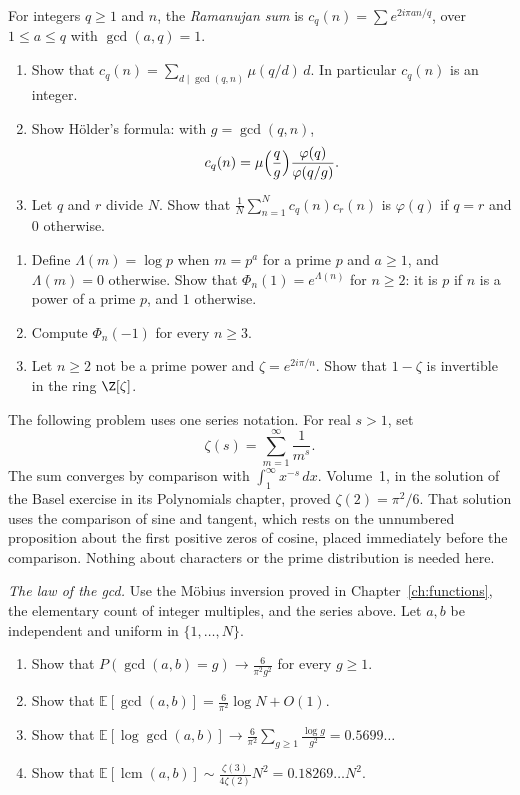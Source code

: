 \begin{exercise}[$\star\star$]\label{pb:ramsum}
For integers $q\ge1$ and $n$, the \emph{Ramanujan sum} is $c_q(n)=\sum e^{2i\pi an/q}$, over $1\le a\le q$ with
$\gcd(a,q)=1$.
\begin{enumerate}[label=(\alph*)]
\item Show that $c_q(n)=\sum_{d\mid\gcd(q,n)}\mu(q/d)\,d$. In particular $c_q(n)$ is an integer.
\item Show Hölder's formula: with $g=\gcd(q,n)$,
\[
c_q(n)=\mu\Bigl(\frac qg\Bigr)\frac{\varphi(q)}{\varphi(q/g)}.
\]
\item Let $q$ and $r$ divide $N$. Show that $\frac1N\sum_{n=1}^Nc_q(n)c_r(n)$ is $\varphi(q)$ if $q=r$ and $0$ otherwise.
\end{enumerate}
\end{exercise}

\begin{exercise}[$\star\star$]\label{pb:phipm1}
\begin{enumerate}[label=(\alph*)]
\item Define $\Lambda(m)=\log p$ when $m=p^a$ for a prime $p$ and $a\ge1$, and $\Lambda(m)=0$ otherwise. Show that $\Phi_n(1)=e^{\Lambda(n)}$ for $n\ge2$: it is $p$ if $n$ is a power of a prime $p$, and $1$ otherwise.
\item Compute $\Phi_n(-1)$ for every $n\ge3$.
\item Let $n\ge2$ not be a prime power and $\zeta=e^{2i\pi/n}$. Show that $1-\zeta$ is invertible in the ring $\Z[\zeta]$.
\end{enumerate}
\end{exercise}

The following problem uses one series notation. For real $s>1$, set
\[
\zeta(s)=\sum_{m=1}^{\infty}\frac1{m^s}.
\]
The sum converges by comparison with $\int_1^\infty x^{-s}\,dx$.
Volume~1, in the solution of the Basel exercise in its Polynomials chapter, proved $\zeta(2)=\pi^2/6$. That solution uses the comparison of sine and tangent, which rests on the unnumbered proposition about the first positive zeros of cosine, placed immediately before the comparison. Nothing about characters
or the prime distribution is needed here.

\begin{exercise}[Journey]\label{pb:gcdmean}
\emph{The law of the gcd.} Use the M\"obius inversion proved in
Chapter~\ref{ch:functions}, the elementary count of integer multiples,
and the series above. Let $a,b$ be independent and uniform in $\{1,\dots,N\}$.
\begin{enumerate}[label=(\alph*)]
\item Show that $P(\gcd(a,b)=g)\to\frac6{\pi^2g^2}$ for every $g\ge1$.
\item Show that $\mathbb E[\gcd(a,b)]=\frac6{\pi^2}\log N+O(1)$.
\item Show that $\displaystyle\mathbb E[\log\gcd(a,b)]\longrightarrow
\frac6{\pi^2}\sum_{g\ge1}\frac{\log g}{g^2}=0.5699\ldots$
\item Show that $\mathbb E[\operatorname{lcm}(a,b)]\sim\frac{\zeta(3)}{4\zeta(2)}N^2=0.18269\ldots N^2$.
\end{enumerate}
\end{exercise}

